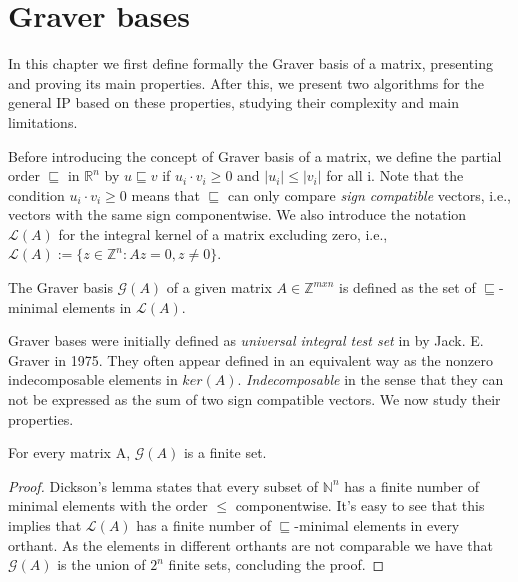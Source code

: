 \chapter{Graver bases} \label{2.Graver_bases}

In this chapter we first define formally the Graver basis of a matrix, presenting and proving its main properties. After this, we present two algorithms for the general IP based on these properties, studying their complexity and main limitations. 

Before introducing the concept of Graver basis of a matrix, we define the partial order $\sqsubseteq$ in $\mathbb{R}^n$ by $u \sqsubseteq v$ if $u_i \cdot v_i \geq 0$ and $|u_i| \leq |v_i|$ for all i. Note that the condition $u_i \cdot v_i \geq 0$ means that $\sqsubseteq$ can only compare \textit{sign compatible} vectors, i.e., vectors with the same sign componentwise. We also introduce the notation $\mathcal{L}(A)$ for the integral kernel of a matrix excluding zero, i.e., $\mathcal{L}(A) := \{z \in \mathbb{Z}^n: Az = 0, z\neq0\}$.

\begin{definition}
The Graver basis $\mathcal{G}(A)$ of a given matrix $A \in \mathbb{Z}^{mxn}$ is defined as the set of $\sqsubseteq$-minimal elements in $\mathcal{L}(A)$.
\end{definition}

\vspace{-5pt}
Graver bases were initially defined as \textit{universal integral test set} in \cite{GRAVER:1975} by Jack. E. Graver in 1975. They often appear defined in an equivalent way as the nonzero indecomposable elements in $ker(A)$. \emph{Indecomposable} in the sense that they can not be expressed as the sum of two sign compatible vectors. We now study their properties.

\begin{proposition}\label{GB_finite}
For every matrix A, $\mathcal{G}(A)$ is a finite set.
\end{proposition}
\vspace{-20pt}
\begin{proof}
Dickson's lemma states that every subset of $\mathbb{N}^n$ has a finite number of minimal elements with the order $\leq$ componentwise. It's easy to see that this implies that $\mathcal{L}(A)$ has a finite number of $\sqsubseteq$-minimal elements in every orthant. As the elements in different orthants are not comparable we have that $\mathcal{G}(A)$ is the union of $2^n$ finite sets, concluding the proof.
\end{proof}

